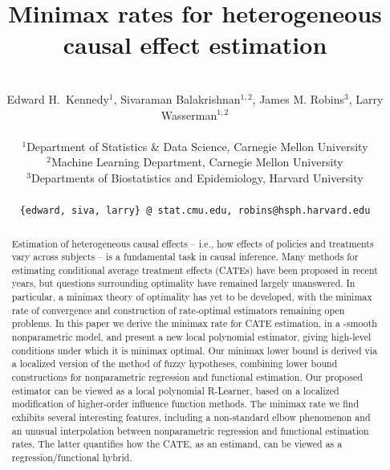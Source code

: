 \documentclass[11pt,twoside]{article}
\newcommand{\Holder}{\text{H\"{o}lder}}
\theoremstyle{definition}
\theoremstyle{remark}
\begin{document}
\def\spacingset#1{\renewcommand{\baselinestretch}%
{#1}\small\normalsize} \spacingset{1}

\raggedbottom
\allowdisplaybreaks[1]


  

  
  \title{\vspace*{-.4in} {Minimax rates for heterogeneous causal effect estimation}}
  \author{\\ Edward H.\ Kennedy$^1$, Sivaraman Balakrishnan$^{1,2}$, James M. Robins$^3$, Larry Wasserman$^{1,2}$ \\ \\
    $^1$Department of Statistics \& Data Science, Carnegie Mellon University \\ 
    $^2$Machine Learning Department, Carnegie Mellon University \\ 
    $^3$Departments of Biostatistics and Epidemiology, Harvard University \\ \\
    \texttt{\{edward, siva, larry\} @ stat.cmu.edu, robins@hsph.harvard.edu}  \\
\date{}
    }

  \maketitle
  \thispagestyle{empty}

\begin{abstract}
Estimation of heterogeneous causal effects -- i.e., how effects of policies and treatments vary across subjects -- is a fundamental task in causal inference. Many methods for estimating conditional average treatment effects (CATEs) have been proposed in recent years, but questions surrounding optimality have remained largely unanswered. In particular, a minimax theory of optimality has yet to be developed, with the minimax rate of convergence and construction of rate-optimal estimators remaining open problems.
In this paper we derive the minimax rate for CATE estimation, in a \Holder{}-smooth nonparametric model, and present a new local polynomial estimator, giving high-level conditions under which it is minimax optimal. 
Our minimax lower bound is derived via a localized version of the method of fuzzy hypotheses, combining lower bound constructions for nonparametric regression and functional estimation. Our proposed estimator can be viewed as a local polynomial R-Learner, based on a localized modification of higher-order influence function methods. 
The minimax rate we find exhibits several interesting features, including a non-standard elbow phenomenon and an unusual interpolation between nonparametric regression and functional estimation rates. The latter quantifies how the CATE, as an estimand, can be viewed as a regression/functional hybrid. 
\end{abstract}
\end{document}
